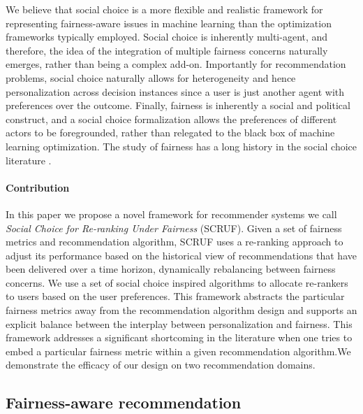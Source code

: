 We believe that social choice is a more flexible and realistic framework for representing fairness-aware issues in machine learning than the optimization frameworks typically employed. Social choice is inherently multi-agent, and therefore, the idea of the integration of multiple fairness concerns naturally emerges, rather than being a complex add-on. Importantly for recommendation problems, social choice naturally allows for heterogeneity and hence personalization across decision instances since a user is just another agent with preferences over the outcome. Finally, fairness is inherently a social and political construct, and a social choice formalization allows the preferences of different actors to be foregrounded, rather than relegated to the black box of machine learning optimization. The study of fairness has a long history in the social choice literature \cite{Young:Equity,Zwicker:Voting}.

\paragraph{\textbf{Contribution}}
In this paper we propose a novel framework for recommender systems we call \textit{Social Choice for Re-ranking Under Fairness} (SCRUF).  Given a set of fairness metrics and recommendation algorithm, SCRUF uses a re-ranking approach to adjust its performance based on the historical view of recommendations that have been delivered over a time horizon, dynamically rebalancing between fairness concerns.  We use a set of social choice inspired algorithms to allocate re-rankers to users based on the user preferences. This framework abstracts the particular fairness metrics away from the recommendation algorithm design and supports an explicit balance between the interplay between personalization and fairness.  This framework addresses a significant shortcoming in the literature when one tries to embed a particular fairness metric within a given recommendation algorithm.We demonstrate the efficacy of our design on two recommendation domains.

\subsection{Fairness-aware recommendation}

